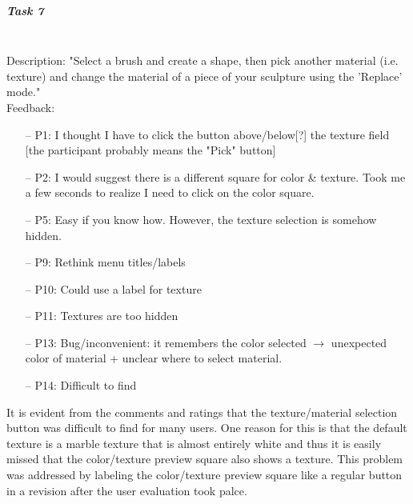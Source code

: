 \subparagraph{Task 7} \hfill \\
Description: "Select a brush and create a shape, then pick another material (i.e. texture) and change the material of a piece of your sculpture using the 'Replace' mode."\\
Feedback:
\begin{enumerate} \setlength\itemsep{-0.5em}
	\item[--] P1: I thought I have to click the button above/below[?] the texture field [the participant probably means the "Pick" button]
	\item[--] P2: I would suggest there is a different square for color \& texture. Took me a few seconds to realize I need to click on the color square.
	\item[--] P5: Easy if you know how. However, the texture selection is somehow hidden.
	\item[--] P9: Rethink menu titles/labels
	\item[--] P10: Could use a label for texture
	\item[--] P11: Textures are too hidden
	\item[--] P13: Bug/inconvenient: it remembers the color selected $\rightarrow$ unexpected color of material + unclear where to select material.
	\item[--] P14: Difficult to find
\end{enumerate}
It is evident from the comments and ratings that the texture/material selection button was difficult to find for many users. One reason for this is that the default texture is a marble texture that is almost entirely white and thus it is easily missed that the color/texture preview square also shows a texture. This problem was addressed by labeling the color/texture preview square like a regular button in a revision after the user evaluation took palce.

